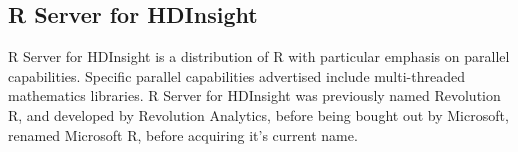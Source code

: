\documentclass[10pt,a4paper]{article}
\begin{document}
\subsection{R Server for HDInsight}
\label{sec:r-server-hdinsight}
\nocite{azure16:_r_server_hdins_r_analy}
R Server for HDInsight is a distribution of R with particular emphasis
on parallel capabilities. Specific parallel capabilities advertised
include multi-threaded mathematics libraries. R Server for HDInsight
was previously named Revolution R, and developed by Revolution
Analytics, before being bought out by Microsoft, renamed Microsoft R,
before acquiring it's current name.
\end{document}
